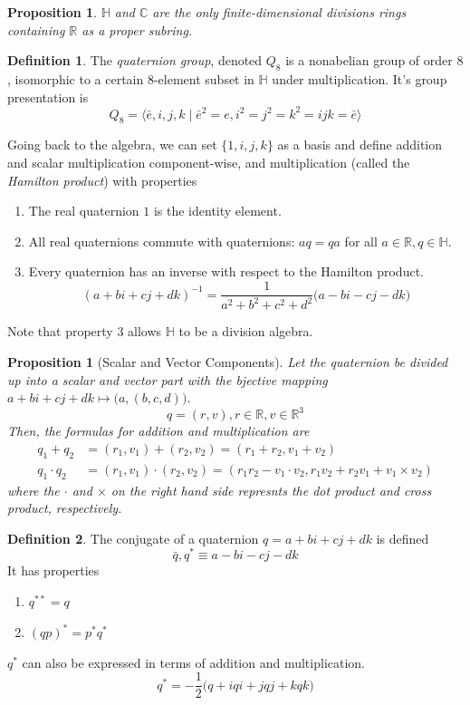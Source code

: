 \documentclass{article}
\newtheorem{proposition}[theorem]{Proposition}
\theoremstyle{remark}
\theoremstyle{definition}
\newtheorem{definition}{Definition}[section]
\begin{document}
\begin{proposition}
$\mathbb{H}$ and $\mathbb{C}$ are the only finite-dimensional divisions rings containing $\mathbb{R}$ as a proper subring. 
\end{proposition}

\begin{definition}
The \textit{quaternion group}, denoted $Q_8$ is a nonabelian group of order $8$, isomorphic to a certain $8$-element subset in $\mathbb{H}$ under multiplication. It's group presentation is 
\[Q_8 = \big\langle \bar{e}, i, j, k \;|\; \bar{e}^2 = e, i^2 = j^2 = k^2 = ijk = \bar{e} \big\rangle\]
\end{definition}

Going back to the algebra, we can set $\{1, i, j, k\}$ as a basis and define addition and scalar multiplication component-wise, and multiplication (called the \textit{Hamilton product}) with properties
\begin{enumerate}
    \item The real quaternion $1$ is the identity element. 
    \item All real quaternions commute with quaternions: $a q = q a$ for all $a \in \mathbb{R}, q \in \mathbb{H}$. 
    \item Every quaternion has an inverse with respect to the Hamilton product. 
    \[(a + bi + cj + dk)^{-1} = \frac{1}{a^2 + b^2 + c^2 + d^2} \big( a - bi - cj - dk\big)\]
\end{enumerate}
Note that property 3 allows $\mathbb{H}$ to be a division algebra. 

\begin{proposition}[Scalar and Vector Components]
Let the quaternion be divided up into a scalar and vector part with the bjective mapping $a + bi + cj + dk \mapsto \big(a, (b, c, d)\big)$. 
\[q = (r, v), r \in \mathbb{R}, v \in \mathbb{R}^3\]
Then, the formulas for addition and multiplication are
\begin{align*}
    q_1 + q_2 & = (r_1, v_1) + (r_2, v_2) = (r_1 + r_2, v_1 + v_2) \\
    q_1 \cdot q_2 & = (r_1, v_1) \cdot (r_2, v_2) = (r_1 r_2 - v_1 \cdot v_2, r_1 v_2 + r_2 v_1 + v_1 \times v_2)
\end{align*}
where the $\cdot$ and $\times$ on the right hand side represnts the dot product and cross product, respectively. 
\end{proposition}

\begin{definition}
The conjugate of a quaternion $q = a + bi + cj + dk$ is defined 
\[\bar{q}, q^* \equiv a - bi - cj - dk\]
It has properties
\begin{enumerate}
    \item $q^{**} = q$
    \item $(q p)^* = p^* q^*$
\end{enumerate}
$q^*$ can also be expressed in terms of addition and multiplication. 
\[q^* = -\frac{1}{2} \big( q + iqi + jqj + kqk \big)\]
\end{definition}
\end{document}
